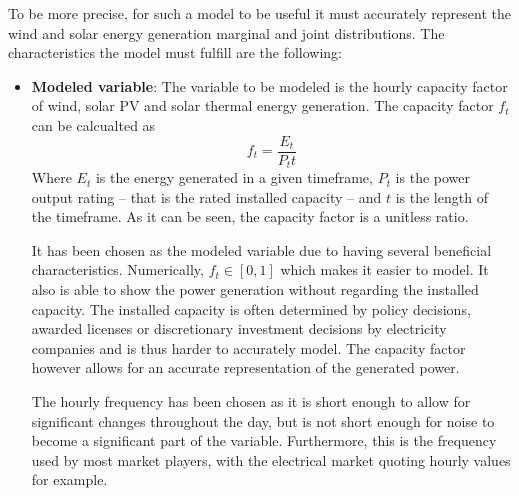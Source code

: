 To be more precise, for such a model to be useful it must accurately represent the wind and solar energy generation marginal and joint distributions. The characteristics the model must fulfill are the following:
\begin{itemize}
    \item \textbf{Modeled variable}: The variable to be modeled is the hourly capacity factor of wind, solar PV and solar thermal energy generation. The capacity factor $f_t$ can be calcualted as 
    \begin{equation}
        \label{eq:capacity-factor}
        f_t=\frac{E_t}{P_t t}
    \end{equation}
    Where $E_t$ is the energy generated in a given timeframe, $P_t$ is the power output rating -- that is the rated installed capacity -- and $t$ is the length of the timeframe. As it can be seen, the capacity factor is a unitless ratio. 
    
    It has been chosen as the modeled variable due to having several beneficial characteristics. Numerically, $f_t \in \left[0,1\right]$ which makes it easier to model. It also is able to show the power generation without regarding the installed capacity. The installed capacity is often determined by policy decisions, awarded licenses or discretionary investment decisions by electricity companies and is thus harder to accurately model. The capacity factor however allows for an accurate representation of the generated power. 

    The hourly frequency has been chosen as it is short enough to allow for significant changes throughout the day, but is not short enough for noise to become a significant part of the variable. Furthermore, this is the frequency used by most market players, with the electrical market quoting hourly values for example. 


\end{itemize}
